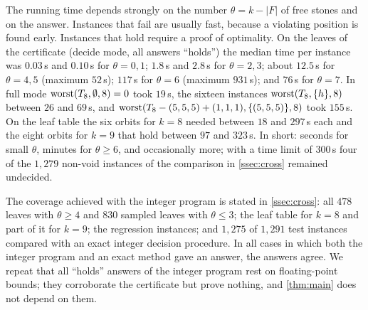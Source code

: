 The running time depends strongly on the number $\theta=k-|F|$ of free stones and on the answer. Instances
that fail are usually fast, because a violating position is found early. Instances that hold require a
proof of optimality. On the leaves of the certificate (decide mode, all answers ``holds'') the median
time per instance was $0.03$\,s and $0.10$\,s for $\theta=0,1$; $1.8$\,s and $2.8$\,s for $\theta=2,3$;
about $12.5$\,s for $\theta=4,5$ (maximum $52$\,s); $117$\,s for $\theta=6$ (maximum $931$\,s); and
$76$\,s for $\theta=7$. In full mode $\operatorname{worst}(T_8,\emptyset,8)=0$ took $19$\,s, the sixteen instances
$\operatorname{worst}(T_8,\{h\},8)$ between $26$ and $69$\,s, and
$\operatorname{worst}(T_8-(5,5,5)+(1,1,1),\{(5,5,5)\},8)$ took $155$\,s. On the leaf table the six orbits for $k=8$
needed between $18$ and $297$\,s each and the eight orbits for $k=9$ that hold between $97$ and $323$\,s. In
short: seconds for small $\theta$, minutes for $\theta\ge6$, and occasionally more; with a time limit of
$300$\,s four of the $1{,}279$ non-void instances of the comparison in \cref{ssec:cross} remained
undecided.

The coverage achieved with the integer program is stated in \cref{ssec:cross}: all $478$ leaves with
$\theta\ge4$ and $830$ sampled leaves with $\theta\le3$; the leaf table for $k=8$ and part of it for $k=9$;
the regression instances; and $1{,}275$ of $1{,}291$ test instances compared with an exact integer decision
procedure. In all cases in which both the integer program and an exact method gave an answer, the answers
agree. We repeat that all ``holds'' answers of the integer program rest on floating-point bounds; they
corroborate the certificate but prove nothing, and \cref{thm:main} does not depend on them.
